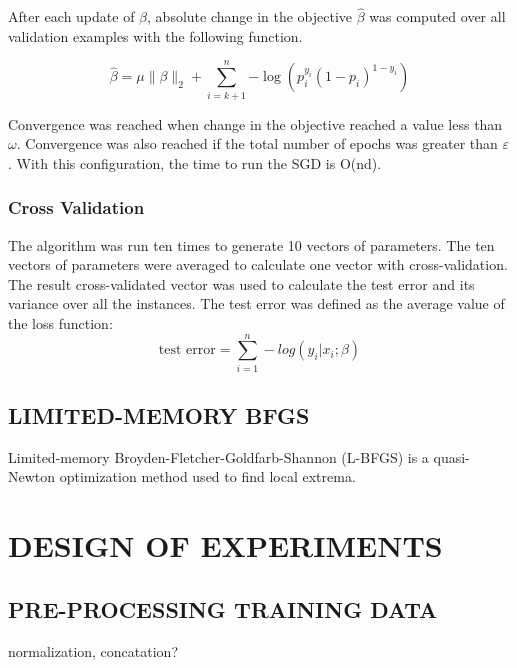 After each update of $\beta$, absolute change in the objective $\widehat{\beta}$ was computed over all validation examples with the following function.

\begin{equation}
    \widehat{\beta} = \mu \|\beta\|_2 + \sum_{i=k+1}^{n}{-\log(p_i^{y_i}(1 - p_i)^{1-y_i})}
\end{equation}

Convergence was reached when change in the objective reached a value less than $\omega$. Convergence was also reached if the total number of epochs was greater than $\varepsilon$. With this configuration, the time to run the SGD is O(nd).

\subsubsection{Cross Validation}
The algorithm was run ten times to generate 10 vectors of parameters. The ten vectors of parameters were averaged to calculate one vector with cross-validation. The result cross-validated vector was used to calculate the test error and its variance over all the instances. The test error was defined as the average value of the loss function:
\begin{equation}
        \textrm{test error} = \sum_{i=1}^{n} -log(y_i | x_i ; \beta )
\end{equation}







\subsection{LIMITED-MEMORY BFGS}
Limited-memory Broyden-Fletcher-Goldfarb-Shannon (L-BFGS) is a quasi-Newton
optimization method used to find local extrema.



\section{DESIGN OF EXPERIMENTS}
\label{sec:experiments}

\subsection{PRE-PROCESSING TRAINING DATA}
normalization, concatation?


